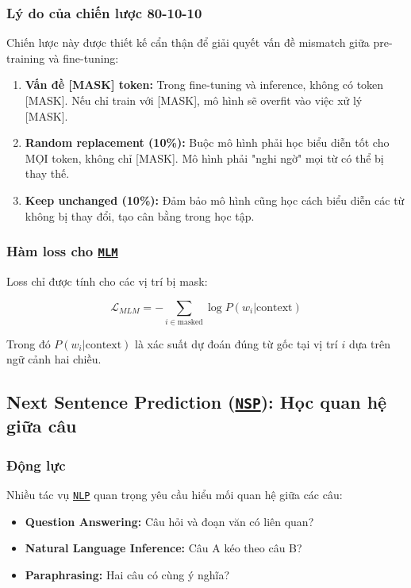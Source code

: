 \subsubsection{Lý do của chiến lược 80-10-10}
Chiến lược này được thiết kế cẩn thận để giải quyết vấn đề mismatch giữa pre-training và fine-tuning:

\begin{enumerate}
    \item \textbf{Vấn đề [MASK] token:} Trong fine-tuning và inference, không có token [MASK]. Nếu chỉ train với [MASK], mô hình sẽ overfit vào việc xử lý [MASK].
    
    \item \textbf{Random replacement (10\%):} Buộc mô hình phải học biểu diễn tốt cho MỌI token, không chỉ [MASK]. Mô hình phải "nghi ngờ" mọi từ có thể bị thay thế.
    
    \item \textbf{Keep unchanged (10\%):} Đảm bảo mô hình cũng học cách biểu diễn các từ không bị thay đổi, tạo cân bằng trong học tập.
\end{enumerate}

\subsubsection{Hàm loss cho \hyperref[acro:mlm]{\texttt{MLM}}}
Loss chỉ được tính cho các vị trí bị mask:

\begin{equation}
\mathcal{L}_{MLM} = -\sum_{i \in \text{masked}} \log P(w_i | \text{context})
\label{eq:mlm_loss}
\end{equation}

Trong đó $P(w_i | \text{context})$ là xác suất dự đoán đúng từ gốc tại vị trí $i$ dựa trên ngữ cảnh hai chiều.

\subsection{Next Sentence Prediction (\hyperref[acro:nsp]{\texttt{NSP}}): Học quan hệ giữa câu}
\label{ssec:nsp}

\subsubsection{Động lực}
Nhiều tác vụ \hyperref[acro:nlp]{\texttt{NLP}} quan trọng yêu cầu hiểu mối quan hệ giữa các câu:
\begin{itemize}
    \item \textbf{Question Answering:} Câu hỏi và đoạn văn có liên quan?
    \item \textbf{Natural Language Inference:} Câu A kéo theo câu B?
    \item \textbf{Paraphrasing:} Hai câu có cùng ý nghĩa?
\end{itemize}

